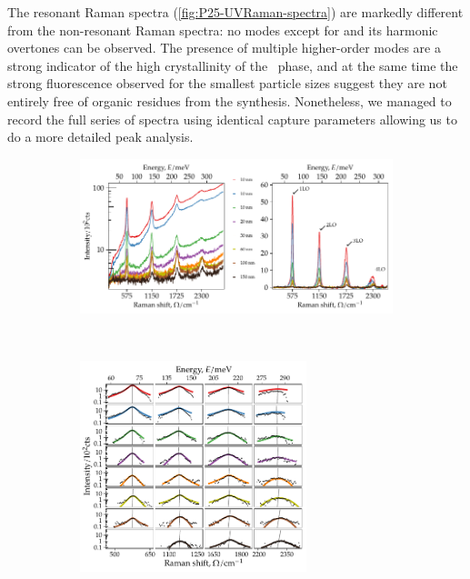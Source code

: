 \documentclass[draft,webedition,openright,titles,swedish,english]{LuaUUThesis}\usepackage[]{graphicx}\usepackage[]{xcolor}
\newenvironment{knitrout}{}{} %
\begin{document}
The resonant Raman spectra (\cref{fig:P25-UVRaman-spectra}) are markedly different
from the non-resonant Raman spectra:
no modes except for  and its harmonic overtones can be observed.
The presence of multiple higher-order modes are a strong indicator of the high
crystallinity of the \ZnO\ phase, and at the same time the strong fluorescence
observed for the smallest particle sizes suggest they are not entirely free of
organic residues from the synthesis. Nonetheless, we managed to record the full
series of spectra using identical capture parameters allowing us to do a more
detailed peak analysis.

\begin{figure}[tbp]
\centering
\begin{subfigure}[b]{\textwidth}
\centering
\begin{knitrout}\scriptsize
{}\color{fgcolor}

{\centering \includegraphics[width=4.72in]{figure/0525P-fig-UVRaman-baseline-1} 

}


\end{knitrout}
\caption{}
\label{fig:P25-UVRaman-baseline}
\end{subfigure}%
\\%
\begin{subfigure}{0.55\textwidth}
\centering
% 
\begin{knitrout}\scriptsize
{}\color{fgcolor}

{\centering \includegraphics[width=2.596in]{figure/0525P-fig-UVRaman-peaks-in-grid-1} 

}
\end{knitrout}
\end{subfigure}
\end{figure}
\end{document}
